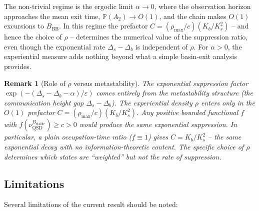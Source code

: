 \documentclass[11pt]{article}
\newtheorem{remark}[theorem]{Remark}
\newcommand{\eps}{\varepsilon}
\newcommand{\Ds}{\Delta_s}
\newcommand{\Db}{\Delta_b}
\newcommand{\Bstable}{B_{\mathrm{stable}}}
\newcommand{\BBB}{B_{\mathrm{BB}}}
\newcommand{\QSD}{\mathrm{QSD}}
\begin{document}
The non-trivial regime is the ergodic limit $\alpha \to 0$, where
the observation horizon approaches the mean exit time,
$\mathbb{P}(A_2) \to O(1)$, and the chain makes $O(1)$ excursions
to $\BBB$.  In this regime the prefactor
$C = (\rho_{\max}/c)(K_b/K_s^2)$ -- and hence the choice of
$\rho$ -- determines the numerical value of the suppression ratio,
even though the exponential rate $\Ds - \Db$ is independent of
$\rho$.  For $\alpha > 0$, the experiential measure adds nothing
beyond what a simple basin-exit analysis provides.

\begin{remark}[Role of $\rho$ versus metastability]\label{rem:rho-vs-metastability}
The exponential suppression factor $\exp(-(\Ds - \Db - \alpha)/\eps)$
comes entirely from the metastability structure (the communication
height gap $\Ds - \Db$).  The experiential density $\rho$ enters only
in the $O(1)$ prefactor $C = (\rho_{\max}/c)(K_b/K_s^2)$.  Any
positive bounded functional $f$ with $f(\nu_\QSD^{\Bstable}) \geq
c > 0$ would produce the same exponential suppression.  In particular,
a plain occupation-time ratio ($f \equiv 1$) gives
$C = K_b / K_s^2$ -- the same exponential decay with no
information-theoretic content.  The specific choice of $\rho$
determines which states are ``weighted'' but not the rate of
suppression.
\end{remark}

\subsection{Limitations}

Several limitations of the current result should be noted:
\end{document}
